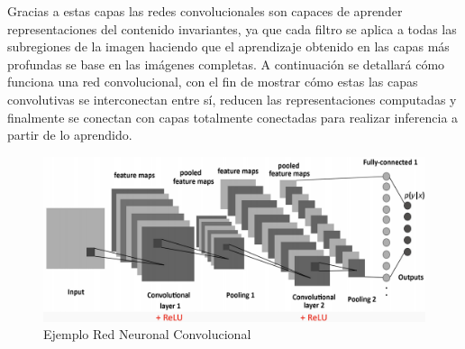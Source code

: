 Gracias a estas capas las redes convolucionales son capaces de aprender representaciones del contenido invariantes, ya que cada filtro se aplica a todas las subregiones de la imagen haciendo que el aprendizaje obtenido en las capas más profundas se base en las imágenes completas. A continuación se detallará cómo funciona una red convolucional, con el fin de mostrar cómo estas las capas convolutivas se interconectan entre sí, reducen las representaciones computadas y finalmente se conectan con capas totalmente conectadas para realizar inferencia a partir de lo aprendido.

\begin{figure}
	\centering
	\includegraphics[width=0.75\linewidth]{images/cnn_explanation}
	\caption[Ejemplo Red Neuronal Convolucional]{Ejemplo Red Neuronal Convolucional}
	\label{fig:cnnexplanation}
\end{figure}

